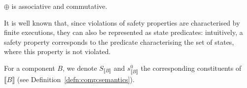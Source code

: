 \documentclass{llncs}
\newcommand{\todoLH}[2][color=orange!40, size=\tiny]{\todo[#1]{\textbf{To-do Ludo:} {#2}}}
\newcommand{\newCoord}[1]{{\color{blue}#1}}
\newcommand{\prop}[1]{Prop.~\ref{prop:#1}}
\newcommand{\cB}{\ensuremath{\mathcal{B}}}
\newcommand{\mdash}[1][]{---#1}
\newcommand{\ie}[1][\ ]{i.e.#1}
\newcommand{\true} {\ensuremath{\mathtt{t\!t}}}
\newcommand{\noop} {\ensuremath{\emptyset}} %
\newcommand{\semclosed}[1]{\ensuremath{\llbracket{#1}\rrbracket}}
\newcommand{\arcomp}{\oplus}
\newcommand{\arequiv}{\equiv}
\begin{document}
$\arcomp$ is associative and commutative.
%

\medskip
\newCoord{It is well known that, since violations of safety properties
  are characterised by finite executions, they can also be represented
  as state predicates: intuitively, a safety property corresponds to
  the predicate characterising the set of states, where this property
  is not violated.}

For a component $B$, we denote $S_{\semclosed{B}}$ and
$s^0_{\semclosed{B}}$ the corresponding constituents of
$\semclosed{B}$ (see Definition~\ref{defn:comp:semantics}).
\end{document}
